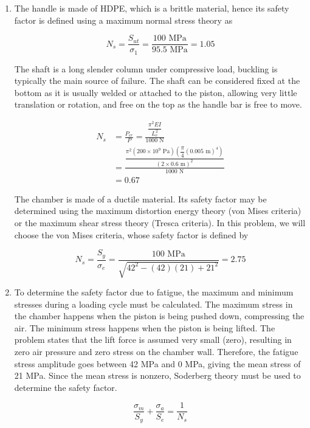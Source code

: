 \documentclass[a4paper,openany,nobib]{tufte-book}
\begin{document}
{{\begin{enumerate}
\begin{enumerate}
Note that there are no shear stresses in any of the component,
therefore the normal stresses found are also principal stresses.

\item The handle is made of HDPE, which is a brittle material, hence its
safety factor is defined using a maximum normal stress theory as

$$N_s = \frac{S_{ut}}{\sigma_1} = \frac{100\text{ MPa}}{95.5\text{ MPa}} = 1.05$$

The shaft is a long slender column under compressive load, buckling
is typically the main source of failure. The shaft can be considered
fixed at the bottom as it is usually welded or attached to the
piston, allowing very little translation or rotation, and free on the
top as the handle bar is free to move.

$$\begin{aligned}
     N_s &= \frac{P_{cr}}{P} = \frac{\dfrac{\pi ^2 EI}{L_e^2}}{1000\text{ N}} \\[0.5em] 
         &= \frac{\dfrac{\pi ^2 (200 \times 10^9 \text{ Pa}) \left( \dfrac{\pi }{4}(0.005\text{ m})^4 \right)}{(2 \times 0.6\text{ m})^2}}{1000\text{ N}} \\[0.5em] 
         &= 0.67\end{aligned}$$

The chamber is made of a ductile material. Its safety factor may be
determined using the maximum distortion energy theory (von Mises
criteria) or the maximum shear stress theory (Tresca criteria). In
this problem, we will choose the von Mises criteria, whose safety
factor is defined by

$$N_s = \frac{S_y}{\sigma_e} = \frac{100\text{ MPa}}{\sqrt {42^2 - (42)(21) + 21^2}} = 2.75$$

\item To determine the safety factor due to fatigue, the maximum and
minimum stresses during a loading cycle must be calculated. The
maximum stress in the chamber happens when the piston is being pushed
down, compressing the air. The minimum stress happens when the piston
is being lifted. The problem states that the lift force is assumed
very small (zero), resulting in zero air pressure and zero stress on
the chamber wall. Therefore, the fatigue stress amplitude goes
between 42 MPa and 0 MPa, giving the mean stress of 21 MPa. Since the
mean stress is nonzero, Soderberg theory must be used to determine
the safety factor.

$$\frac{\sigma _m}{S_y} + \frac{\sigma _a}{S_e} = \frac{1}{N_s}$$


\end{enumerate}
\end{enumerate}}}
\end{document}
